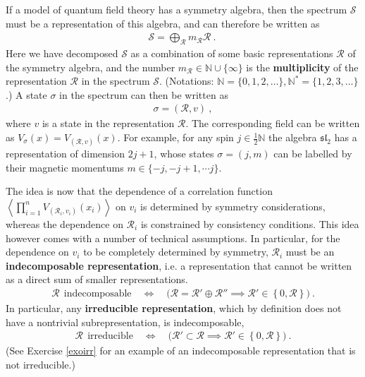 \documentclass[12pt, a4paper, notitlepage, twoside]{report}
\numberwithin{equation}{section}
\theoremstyle{break}
\begin{document}
If a model of quantum field theory has a symmetry algebra, then the spectrum $\mathcal{S}$ must be a representation of this algebra, and can therefore be written as
\begin{align}
 \mathcal{S} = \bigoplus_\mathcal{R} m_\mathcal{R}  \mathcal{R}\ .\
\label{somr}
\end{align}
Here we have decomposed $\mathcal{S}$ as a combination of some basic representations $\mathcal{R}$ of the symmetry algebra, and the number $m_\mathcal{R} \in {\mathbb{N}}\cup\{\infty\}$ is the \textbf{\boldmath multiplicity} of the representation $\mathcal{R}$ in the spectrum $\mathcal{S}$.
(Notations: $\mathbb{N}= \{0,1,2,\dots\}, \mathbb{N}^*=\{1,2,3,\dots\}$.)
A state $\sigma$ in the spectrum can then be written as 
\begin{align}
 \sigma = (\mathcal{R},v)\ ,
\label{arv}
\end{align}
where $v$ is a state in the representation $\mathcal{R}$. 
The corresponding field can be written as 
$V_\sigma(x)= V_{(\mathcal{R},v)}(x)$. 
For example, for any spin $j\in \frac12 \mathbb{N}$ the algebra $\mathfrak{sl}_2$ has a representation of dimension $2j+1$, whose states $\sigma = (j,m)$ can be labelled by their magnetic momentums $m\in\{-j, -j+1,\cdots j\}$.

The idea is now that the dependence of a correlation function $\left\langle \prod_{i=1}^n V_{(\mathcal{R}_i,v_i)}(x_i)\right\rangle$ on $v_i$ is determined by symmetry considerations, whereas the dependence on $\mathcal{R}_i$ is constrained by consistency conditions.
This idea however comes with a number of technical assumptions.
In particular, for the dependence on $v_i$ to be completely determined by symmetry, $\mathcal{R}_i$ must be an \textbf{\boldmath indecomposable representation}, i.e. a representation that cannot be written as a direct sum of smaller representations.
\begin{align}
 \mathcal{R} \ \ \text{indecomposable} \quad \iff \quad 
 \Big(\mathcal{R} = \mathcal{R}'\oplus \mathcal{R}'' \implies \mathcal{R}' \in\left\{ 0,\mathcal{R}\right\}\Big)
 \ .
\end{align}
In particular, any \textbf{\boldmath irreducible representation}, which by definition does not have a nontrivial subrepresentation, is indecomposable,
\begin{align}
 \mathcal{R} \ \ \text{irreducible} \quad \iff \quad 
 \Big(\mathcal{R}'\subset \mathcal{R} \implies \mathcal{R}' \in\left\{ 0,\mathcal{R}\right\}\Big)
 \ .
\end{align}
(See Exercise \ref{exoirr} for an example of an indecomposable representation that is not irreducible.)
\end{document}

